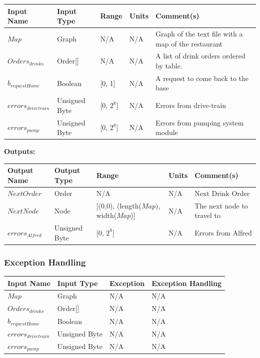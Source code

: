 \documentclass [10pt]{article}
\begin{document}
\begin{longtable}{|l|l|l|l|l|}\hline 
	\rowcolor{tableCell}\textbf{Input Name} & \textbf{Input Type} & \textbf{Range} & \textbf{Units} & \textbf{Comment(s)} \\ \hline
	$ Map $ & Graph & N/A & N/A & Graph of the text file with a map of the restaurant \\ \hline
	\rowcolor{tableCell}$ Orders_{drinks} $ & Order[] & N/A & N/A & A list of drink orders ordered by table. \\ \hline
	$ b_{requestHome} $ & Boolean & [0, 1]& N/A &  A request to come back to the base\\ \hline
	\rowcolor{tableCell}$ errors_{drivetrain} $ & Unsigned Byte & [0, $2^{8}$]& N/A & Errors from drive-train \\ \hline
	$  errors_{pump} $ & Unsigned Byte & [0, $2^{8}$]& N/A & Errors from pumping system module \\ \hline
\end{longtable}


\textbf{Outputs: } \\

\begin{longtable}{|l|l|l|l|l|}\hline 
	\rowcolor{tableCell}\textbf{Output Name} & \textbf{Output Type} & \textbf{Range} & \textbf{Units} & \textbf{Comment(s)} \\ \hline
	$ NextOrder $ & Order & N/A & N/A & Next Drink Order \\ \hline
	\rowcolor{tableCell}$ NextNode $ & Node & [(0,0), (length($Map)$, width($Map$)] & N/A & The next node to travel to \\ \hline
	$  errors_{Alfred} $ & Unsigned Byte & [0, $2^{8}$]& N/A & Errors from Alfred \\ \hline
\end{longtable}


\pagebreak


\subsubsection{Exception Handling}

\begin{longtable}{|l|l|l|l|}\hline 
	\rowcolor{tableCell}\textbf{Input Name} & \textbf{Input Type} & \textbf{Exception} & \textbf{Exception Handling} \\ \hline
	$ Map $ & Graph & N/A & N/A  \\ \hline
	\rowcolor{tableCell}$ Orders_{drinks} $ & Order[] & N/A & N/A \\ \hline
	$ b_{requestHome} $ & Boolean & N/A &  N/A \\ \hline
	\rowcolor{tableCell}$ errors_{drivetrain} $ & Unsigned Byte & N/A & N/A \\ \hline
	$  errors_{pump} $ & Unsigned Byte & N/A & N/A \\ \hline
\end{longtable}
\end{document}
